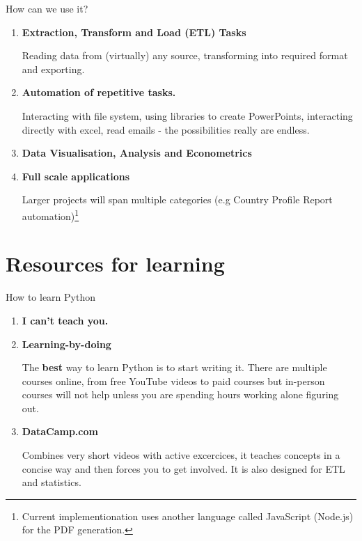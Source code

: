 \documentclass[aspectratio=169]{beamer}
\begin{document}
\begin{frame}{How can we use it?}

\begin{enumerate}
	\item \textbf{Extraction, Transform and Load (ETL) Tasks}

			Reading data from (virtually) any source, transforming into required format and exporting.
	
	\item \textbf{Automation of repetitive tasks.}
	
			Interacting with file system, using libraries to create PowerPoints, interacting directly with excel, read emails - the possibilities really are endless.
			
	\item \textbf{Data Visualisation, Analysis and Econometrics}
	
	\item \textbf{Full scale applications}
		
			Larger projects will span multiple categories (e.g Country Profile Report automation)\footnote{Current implementionation uses another language called JavaScript (Node.js) for the PDF generation.}
	
\end{enumerate}
	
\end{frame}

\section{Resources for learning}

\begin{frame}{How to learn Python}

\begin{enumerate}

\item \textbf{I can't teach you.}
\item \textbf{Learning-by-doing}

		The \textbf{best} way to learn Python is to start writing it. There are multiple courses online, from free YouTube videos to paid courses but in-person courses will not help unless you are spending hours working alone figuring out.
		
\item \textbf{DataCamp.com}
	
		Combines very short videos with active excercices, it teaches concepts in a concise way and then forces you to get involved. It is also designed for ETL and statistics. 
	
\end{enumerate}
\end{frame}
\end{document}
